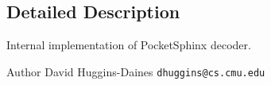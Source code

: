 \subsection{Detailed Description}
Internal implementation of Pocket\+Sphinx decoder. 

\begin{DoxyAuthor}{Author}
David Huggins-\/\+Daines {\tt dhuggins@cs.\+cmu.\+edu} 
\end{DoxyAuthor}
